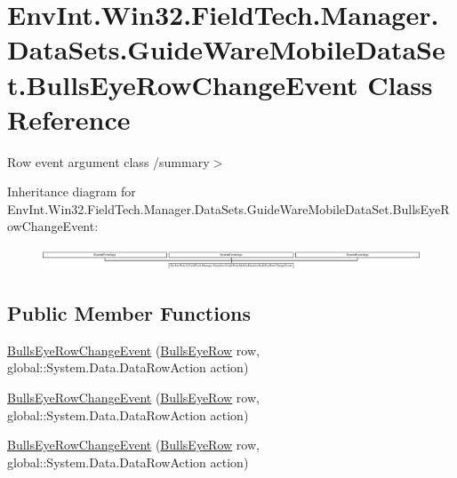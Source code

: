 \hypertarget{class_env_int_1_1_win32_1_1_field_tech_1_1_manager_1_1_data_sets_1_1_guide_ware_mobile_data_set_1_1_bulls_eye_row_change_event}{}\section{Env\+Int.\+Win32.\+Field\+Tech.\+Manager.\+Data\+Sets.\+Guide\+Ware\+Mobile\+Data\+Set.\+Bulls\+Eye\+Row\+Change\+Event Class Reference}
\label{class_env_int_1_1_win32_1_1_field_tech_1_1_manager_1_1_data_sets_1_1_guide_ware_mobile_data_set_1_1_bulls_eye_row_change_event}


Row event argument class /summary$>$  


Inheritance diagram for Env\+Int.\+Win32.\+Field\+Tech.\+Manager.\+Data\+Sets.\+Guide\+Ware\+Mobile\+Data\+Set.\+Bulls\+Eye\+Row\+Change\+Event\+:\begin{figure}[H]
\begin{center}
\leavevmode
\includegraphics[height=0.660767cm]{class_env_int_1_1_win32_1_1_field_tech_1_1_manager_1_1_data_sets_1_1_guide_ware_mobile_data_set_1_1_bulls_eye_row_change_event}
\end{center}
\end{figure}
\subsection*{Public Member Functions}
\begin{DoxyCompactItemize}
\item 
\hyperlink{class_env_int_1_1_win32_1_1_field_tech_1_1_manager_1_1_data_sets_1_1_guide_ware_mobile_data_set_1_1_bulls_eye_row_change_event_a20d28b9e5399d694d672f08d3a6bc72c}{Bulls\+Eye\+Row\+Change\+Event} (\hyperlink{class_env_int_1_1_win32_1_1_field_tech_1_1_manager_1_1_data_sets_1_1_guide_ware_mobile_data_set_1_1_bulls_eye_row}{Bulls\+Eye\+Row} row, global\+::\+System.\+Data.\+Data\+Row\+Action action)
\item 
\hyperlink{class_env_int_1_1_win32_1_1_field_tech_1_1_manager_1_1_data_sets_1_1_guide_ware_mobile_data_set_1_1_bulls_eye_row_change_event_a20d28b9e5399d694d672f08d3a6bc72c}{Bulls\+Eye\+Row\+Change\+Event} (\hyperlink{class_env_int_1_1_win32_1_1_field_tech_1_1_manager_1_1_data_sets_1_1_guide_ware_mobile_data_set_1_1_bulls_eye_row}{Bulls\+Eye\+Row} row, global\+::\+System.\+Data.\+Data\+Row\+Action action)
\item 
\hyperlink{class_env_int_1_1_win32_1_1_field_tech_1_1_manager_1_1_data_sets_1_1_guide_ware_mobile_data_set_1_1_bulls_eye_row_change_event_a20d28b9e5399d694d672f08d3a6bc72c}{Bulls\+Eye\+Row\+Change\+Event} (\hyperlink{class_env_int_1_1_win32_1_1_field_tech_1_1_manager_1_1_data_sets_1_1_guide_ware_mobile_data_set_1_1_bulls_eye_row}{Bulls\+Eye\+Row} row, global\+::\+System.\+Data.\+Data\+Row\+Action action)
\end{DoxyCompactItemize}
